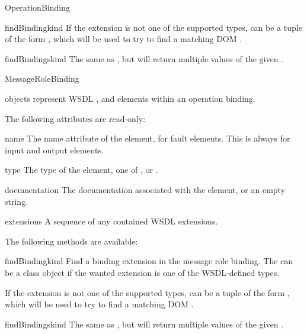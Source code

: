 \begin{classdesc}{OperationBinding}{}
\begin{methoddesc}{findBinding}{kind}
If the extension is not one of the supported types,  can be a
tuple of the form , which will be used to 
try to find a matching DOM .
\end{methoddesc}

\begin{methoddesc}{findBindings}{kind}
The same as , but will return multiple values of 
the given .
\end{methoddesc}

\end{classdesc}


\begin{classdesc}{MessageRoleBinding}{}

 objects represent WSDL , 
 and  elements within an operation binding.

The following attributes are read-only:

\begin{memberdesc}{name}
The name attribute of the element, for fault elements. This is always 
 for input and output elements.
\end{memberdesc}

\begin{memberdesc}{type}
The type of the element, one of ,  or 
.
\end{memberdesc}

\begin{memberdesc}{documentation}
The documentation associated with the element, or an empty string.
\end{memberdesc}

\begin{memberdesc}{extensions}
A sequence of any contained WSDL extensions.
\end{memberdesc}

The following methods are available:

\begin{methoddesc}{findBinding}{kind}
Find a binding extension in the message role binding. The  can be a 
class object if the wanted extension is one of the WSDL-defined types.

If the extension is not one of the supported types,  can be a
tuple of the form , which will be used to 
try to find a matching DOM .
\end{methoddesc}

\begin{methoddesc}{findBindings}{kind}
The same as , but will return multiple values of 
the given .
\end{methoddesc}

\end{classdesc}


